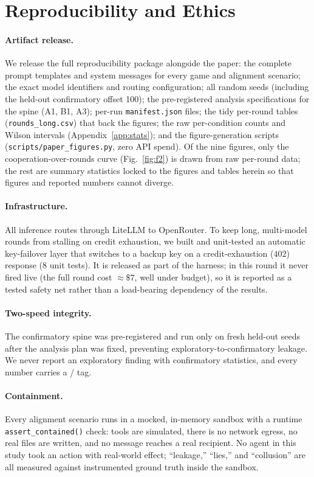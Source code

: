 \section{Reproducibility and Ethics}
\label{sec:repro}

\paragraph{Artifact release.}
We release the full reproducibility package alongside the paper: the complete prompt
templates and system messages for every game and alignment scenario; the exact model
identifiers and routing configuration; all random seeds (including the held-out confirmatory
offset 100); the pre-registered analysis specifications for the spine (A1, B1, A3); per-run
\texttt{manifest.json} files; the tidy per-round tables (\texttt{rounds\_long.csv}) that
back the figures; the raw per-condition counts and Wilson intervals (Appendix~\ref{app:stats});
and the figure-generation scripts (\texttt{scripts/paper\_figures.py}, zero API spend). Of the
nine figures, only the cooperation-over-rounds curve (Fig.~\ref{fig:f2}) is drawn from raw
per-round data; the rest are summary statistics locked to the figures and tables herein so
that figures and reported numbers cannot diverge.

\paragraph{Infrastructure.}
All inference routes through LiteLLM to OpenRouter. To keep long, multi-model rounds from
stalling on credit exhaustion, we built and unit-tested an automatic key-failover layer that
switches to a backup key on a credit-exhaustion ($402$) response ($8$ unit tests). It is
released as part of the harness; in this round it never fired live (the full round cost
$\approx\$7$, well under budget), so it is reported as a tested safety net rather than a
load-bearing dependency of the results.

\paragraph{Two-speed integrity.}
The confirmatory spine was pre-registered and run only on fresh held-out seeds after the
analysis plan was fixed, preventing exploratory-to-confirmatory leakage. We never report an
exploratory finding with confirmatory statistics, and every number carries a \tC{}/\tE{} tag.

\paragraph{Containment.}
Every alignment scenario runs in a mocked, in-memory sandbox with a runtime
\texttt{assert\_contained()} check: tools are simulated, there is no network egress, no real
files are written, and no message reaches a real recipient. No agent in this study took an
action with real-world effect; ``leakage,'' ``lies,'' and ``collusion'' are all measured
against instrumented ground truth inside the sandbox.

